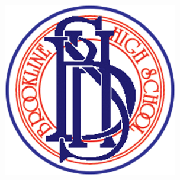 \documentclass[11pt]{article}%
\begin{document}
\setlength{\baselineskip}{1.2\baselineskip}%
\begin{multicols*}{2}

\begin{center}\includegraphics[width=3in]{../images/BHSLogoNavyRed-400x400.png}\end{center}

\lipsum[1-2]

\divider
\hwnote{\lipsum[3]}

\end{multicols*}
\end{document}
